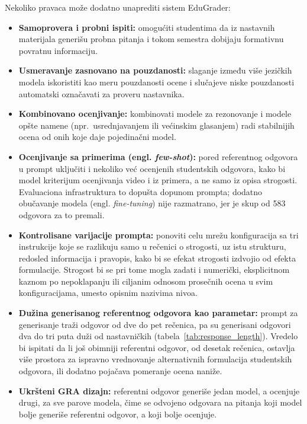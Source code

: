Nekoliko pravaca može dodatno unaprediti sistem EduGrader:
\begin{itemize}
    \item \textbf{Samoprovera i probni ispiti:}
    omogućiti studentima da iz nastavnih materijala generišu probna pitanja i tokom semestra dobijaju formativnu povratnu informaciju.
    \item \textbf{Usmeravanje zasnovano na pouzdanosti:}
    slaganje između više jezičkih modela iskoristiti kao meru pouzdanosti ocene
    i slučajeve niske pouzdanosti automatski označavati za proveru nastavnika.
    \item \textbf{Kombinovano ocenjivanje:}
    kombinovati modele za rezonovanje i modele opšte namene (npr.\ usrednjavanjem ili većinskim glasanjem)
    radi stabilnijih ocena od onih koje daje pojedinačni model.
    \item \textbf{Ocenjivanje sa primerima (engl. \emph{few-shot}):}
    pored referentnog odgovora u prompt uključiti i nekoliko već ocenjenih studentskih odgovora,
    kako bi model kriterijum ocenjivanja video i iz primera, a ne samo iz opisa strogosti.
    Evaluaciona infrastruktura to dopušta dopunom prompta;
    dodatno obučavanje modela (engl. \emph{fine-tuning}) nije razmatrano, jer je skup od 583 odgovora za to premali.
    \item \textbf{Kontrolisane varijacije prompta:}
    ponoviti celu mrežu konfiguracija sa tri instrukcije koje se razlikuju samo u rečenici o strogosti,
    uz istu strukturu, redosled informacija i pravopis, kako bi se efekat strogosti izdvojio od efekta formulacije.
    Strogost bi se pri tome mogla zadati i numerički, eksplicitnom kaznom po nepoklapanju ili ciljanim odnosom prosečnih ocena
    u svim konfiguracijama, umesto opisnim nazivima nivoa.
    \item \textbf{Dužina generisanog referentnog odgovora kao parametar:}
    prompt za generisanje traži odgovor od dve do pet rečenica,
    pa su generisani odgovori dva do tri puta duži od nastavničkih (tabela~\ref{tab:response_length}).
    Vredelo bi ispitati da li još obimniji referentni odgovor, od desetak rečenica,
    ostavlja više prostora za ispravno vrednovanje alternativnih formulacija studentskih odgovora,
    ili dodatno pojačava pomeranje ocena naniže.
    \item \textbf{Ukršteni GRA dizajn:}
    referentni odgovor generiše jedan model, a ocenjuje drugi, za sve parove modela,
    čime se odvojeno odgovara na pitanja koji model bolje generiše referentni odgovor, a koji bolje ocenjuje.

\end{itemize}
